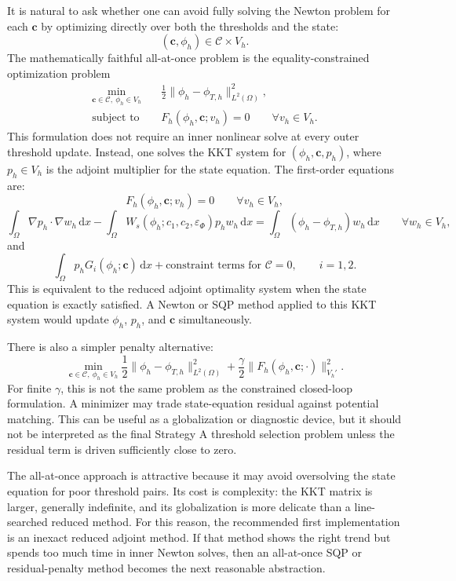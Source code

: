 \documentclass[11pt]{article}
\newcommand{\dd}{\,\mathrm d}
\newcommand{\OmegaD}{\Omega}
\newcommand{\W}{W}
\newcommand{\cvec}{\bm c}
\newcommand{\epsp}{\varepsilon_\Phi}
\begin{document}
It is natural to ask whether one can avoid fully solving the Newton problem
for each \(\cvec\) by optimizing directly over both the thresholds and the
state:
\[
  (\cvec,\phi_h)\in\mathcal C\times V_h.
\]
The mathematically faithful all-at-once problem is the equality-constrained
optimization problem
\[
  \boxed{
  \begin{aligned}
  \min_{\cvec\in\mathcal C,\ \phi_h\in V_h}
  \quad&
  \frac{1}{2}\|\phi_h-\phi_{T,h}\|_{L^2(\OmegaD)}^2,\\
  \text{subject to}\quad&
  F_h(\phi_h,\cvec;v_h)=0
  \qquad \forall v_h\in V_h.
  \end{aligned}
  }
\]
This formulation does not require an inner nonlinear solve at every outer
threshold update.  Instead, one solves the KKT system for
\((\phi_h,\cvec,p_h)\), where \(p_h\in V_h\) is the adjoint multiplier for the
state equation.  The first-order equations are:
\[
  F_h(\phi_h,\cvec;v_h)=0
  \qquad
  \forall v_h\in V_h,
\]
\[
  \int_{\OmegaD}\nabla p_h\cdot\nabla w_h\dd x
  -
  \int_{\OmegaD}
    \W_s(\phi_h;c_1,c_2,\epsp)p_h w_h
  \dd x
  =
  \int_{\OmegaD}(\phi_h-\phi_{T,h})w_h\dd x
  \qquad
  \forall w_h\in V_h,
\]
and
\[
  \int_{\OmegaD}p_hG_i(\phi_h;\cvec)\dd x
  +
  \text{constraint terms for }\mathcal C
  =
  0,
  \qquad i=1,2.
\]
This is equivalent to the reduced adjoint optimality system when the state
equation is exactly satisfied.  A Newton or SQP method applied to this KKT
system would update \(\phi_h\), \(p_h\), and \(\cvec\) simultaneously.

There is also a simpler penalty alternative:
\[
  \min_{\cvec\in\mathcal C,\ \phi_h\in V_h}
  \frac{1}{2}\|\phi_h-\phi_{T,h}\|_{L^2(\OmegaD)}^2
  +
  \frac{\gamma}{2}
  \|F_h(\phi_h,\cvec;\cdot)\|_{V_h'}^2.
\]
For finite \(\gamma\), this is not the same problem as the constrained
closed-loop formulation.  A minimizer may trade state-equation residual against
potential matching.  This can be useful as a globalization or diagnostic
device, but it should not be interpreted as the final Strategy A threshold
selection problem unless the residual term is driven sufficiently close to
zero.

The all-at-once approach is attractive because it may avoid oversolving the
state equation for poor threshold pairs.  Its cost is complexity: the KKT
matrix is larger, generally indefinite, and its globalization is more delicate
than a line-searched reduced method.  For this reason, the recommended first
implementation is an inexact reduced adjoint method.  If that method shows the
right trend but spends too much time in inner Newton solves, then an all-at-once
SQP or residual-penalty method becomes the next reasonable abstraction.
\end{document}
